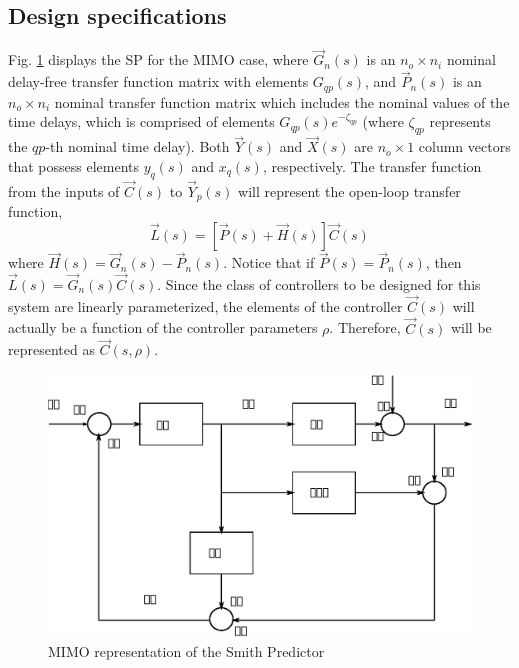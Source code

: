 \documentclass[default]{svmult}
\begin{document}
\subsection{Design specifications}\label{sec:mimo_des}
Fig. \ref{fig:mimo_block} displays the SP for the MIMO case,
where $\vec{G}_n(s)$ is an $n_o \times n_i$ nominal delay-free transfer function matrix with elements $G_{qp}(s)$, and $\vec{P}_n(s)$ is an $n_o \times n_i$ nominal transfer function matrix which includes the nominal values of the time delays, which is comprised of elements $G_{qp}(s)e^{-\zeta_{qp}}$ (where $\zeta_{qp}$ represents the $qp$-th nominal time delay). Both $\vec{Y}(s)$ and $\vec{X}(s)$ are $n_o \times 1$ column vectors that possess elements $y_q(s)$ and $x_q(s)$, respectively. The transfer function from the inputs of $\vec{C}(s)$ to $\vec{Y}_p(s)$ will represent the open-loop transfer function,
\begin{equation}\label{eq:oltfmimo}
\vec{L}(s)=[\vec{P}(s)+\vec{H}(s)]\vec{C}(s)
\end{equation}
where $\vec{H}(s)=\vec{G}_n(s)-\vec{P}_n(s)$. Notice that if $\vec{P}(s)=\vec{P}_n(s)$, then $\vec{L}(s)=\vec{G}_n(s)\vec{C}(s)$. Since the class of controllers to be designed for this system are linearly parameterized, the elements of the controller $\vec{C}(s)$ will actually be a function of the controller parameters $\rho$. Therefore, $\vec{C}(s)$ will be represented as $\vec{C}(s,\rho)$.
\begin{figure}
\centering
{}
\includegraphics[scale=0.6]{fig/mimo_b3.eps}
\caption{MIMO representation of the Smith Predictor}
\label{fig:mimo_block}
\end{figure}
\end{document}

